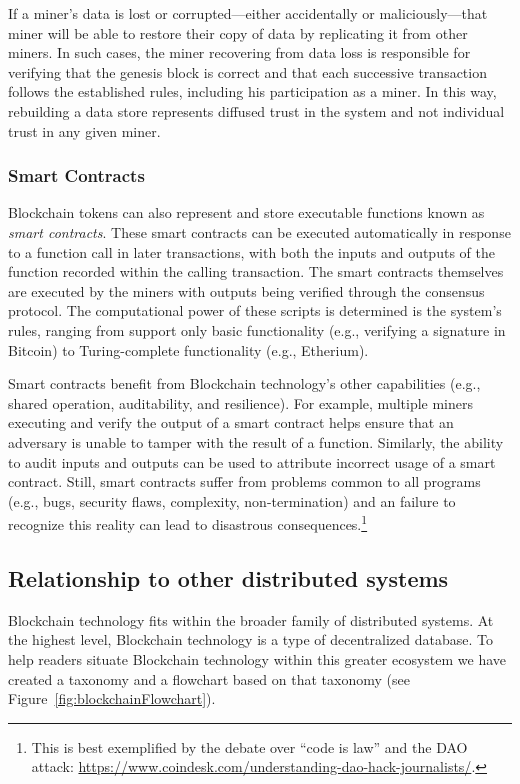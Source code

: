 If a miner's data is lost or corrupted---either accidentally or maliciously---that miner will be able to restore their copy of data by replicating it from other miners.
In such cases, the miner recovering from data loss is responsible for verifying that the genesis block is correct and that each successive transaction follows the established rules, including his participation as a miner.
In this way, rebuilding a data store represents diffused trust in the system and not individual trust in any given miner.

\subsubsection{Smart Contracts}
Blockchain tokens can also represent and store executable functions known as \emph{smart contracts}.
These smart contracts can be executed automatically in response to a function call in later transactions, with both the inputs and outputs of the function recorded within the calling transaction.
The smart contracts themselves are executed by the miners with outputs being verified through the consensus protocol.
The computational power of these scripts is determined is the system's rules, ranging from support only basic functionality (e.g., verifying a signature in Bitcoin) to Turing-complete functionality (e.g., Etherium).

Smart contracts benefit from Blockchain technology's other capabilities (e.g., shared operation, auditability, and resilience).
For example, multiple miners executing and verify the output of a smart contract helps ensure that an adversary is unable to tamper with the result of a function.
Similarly, the ability to audit inputs and outputs can be used to attribute incorrect usage of a smart contract.
Still, smart contracts suffer from problems common to all programs (e.g., bugs, security flaws, complexity, non-termination) and an failure to recognize this reality can lead to disastrous consequences.\footnote{This is best exemplified by the debate over ``code is law'' and the DAO attack: \url{https://www.coindesk.com/understanding-dao-hack-journalists/}.}

\subsection{Relationship to other distributed systems}
Blockchain technology fits within the broader family of distributed systems.
At the highest level, Blockchain technology is a type of decentralized database.
To help readers situate Blockchain technology within this greater ecosystem we have created a taxonomy and a flowchart based on that taxonomy (see Figure~\ref{fig:blockchainFlowchart}).

